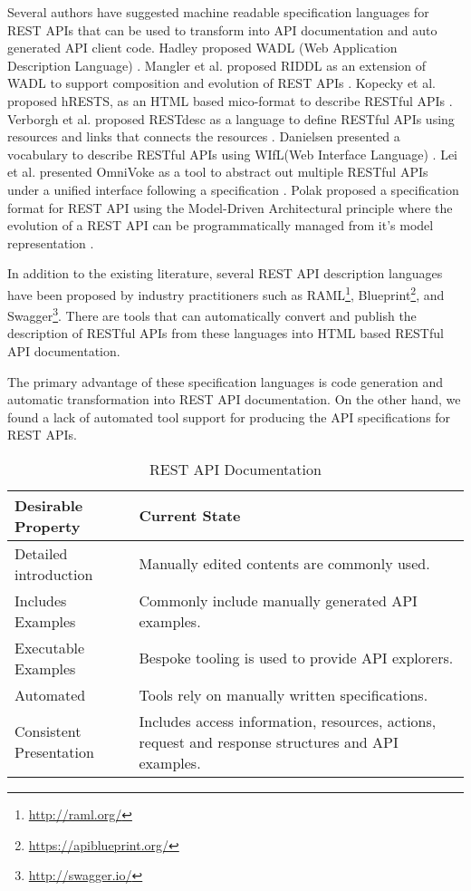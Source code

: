 \documentclass[10pt, conference]{IEEEtran}
\begin{document}
Several authors have suggested machine readable specification languages for REST APIs that can be used to transform into API documentation and auto generated API client code. Hadley proposed WADL (Web Application Description Language) \cite{hadley2006web}. Mangler et al. proposed RIDDL as an extension of WADL to support composition and evolution of REST APIs \cite{mangler2010origin}. Kopecky et al. proposed hRESTS, as an HTML based mico-format to describe RESTful APIs \cite{Kopecky_hrests}. Verborgh et al. proposed RESTdesc as a language to define RESTful APIs using resources and links that connects the resources \cite{RESTdesc}. Danielsen presented a vocabulary to describe RESTful APIs using WIfL(Web Interface Language) \cite{Danielsen_validation}. Lei et al. presented OmniVoke as a tool to abstract out multiple RESTful APIs under a unified interface following a specification \cite{Ning_omnivoke}. Polak proposed a specification format for REST API using the Model-Driven Architectural principle where the evolution of a REST API can be programmatically managed from it's model representation \cite{Polak:2015:RAM:2790798.2790820}.

In addition to the existing literature, several REST API description languages have been proposed by industry practitioners such as RAML\footnote{\url{http://raml.org/}}, Blueprint\footnote{\url{https://apiblueprint.org/}}, and Swagger\footnote{\url{http://swagger.io/}}. There are tools that can automatically convert and publish the description of RESTful APIs from these languages into HTML based RESTful API documentation.

The primary advantage of these specification languages is code generation and automatic transformation into REST API documentation. On the other hand, we found a lack of automated tool support for producing the API specifications for REST APIs.

\begin{table}[!tbh]
  \caption{REST API Documentation}
  \label{table:restful_apis}
\begin{tabular}{|p{1in} | p{2.2in}|}
\hline
\textbf{Desirable Property} & \textbf{Current State} \\
\hline
Detailed introduction &
Manually edited contents are commonly used.
 \\
\hline
Includes Examples &
Commonly include manually generated API examples.
 \\
\hline
Executable Examples &
Bespoke tooling is used to provide API explorers.
 \\
\hline
Automated &
Tools rely on manually written specifications.\\
\hline
Consistent Presentation &
Includes access information, resources, actions, request and response structures and API examples.\\
\hline
\end{tabular}
\end{table}
\end{document}
